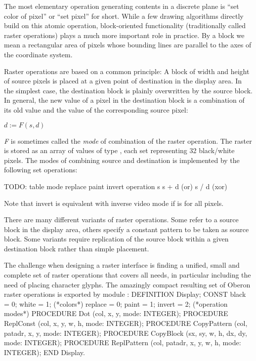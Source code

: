 The most elementary operation generating contents in a discrete plane
is ``set color of pixel'' or ``set pixel'' for short. While a few drawing
algorithms directly build on this atomic operation, block-oriented
functionality (traditionally called raster operations) plays a much
more important role in practice. By a block we mean a rectangular area
of pixels whose bounding lines are parallel to the axes of the
coordinate system.

Raster operations are based on a common principle: A block of width 
and height  of source pixels is placed at a given point of
destination  in the display area. In the simplest case, the
destination block  is plainly overwritten by the
source block. In general, the new value of a pixel in the destination
block is a combination of its old value and the value of the
corresponding source pixel:

$d := F(s, d)$

\emph{F} is sometimes called the \emph{mode} of combination of the
raster operation. The raster is stored as an array of values of type
, each set representing 32 black/white pixels. The modes of
combining source and destination is implemented by the following set
operations:

TODO: table
mode
replace paint invert
operation
s
s + d (or) s / d (xor)

Note that invert is equivalent with inverse video mode if  is 
for all pixels.

There are many different variants of raster operations. Some refer to
a source block in the display area, others specify a constant pattern
to be taken as source block. Some variants require replication of the
source block within a given destination block  rather
than simple placement.

The challenge when designing a raster interface is finding a unified,
small and complete set of raster operations that covers all needs, in
particular including the need of placing character glyphs. The
amazingly compact resulting set of Oberon raster operations is
exported by module :
\begintt
DEFINITION Display;
  CONST black = 0; white = 1; (*colors*)
        replace = 0; paint = 1; invert = 2; (*operation modes*)
  PROCEDURE Dot (col, x, y, mode: INTEGER);
  PROCEDURE ReplConst (col, x, y, w, h, mode: INTEGER);
  PROCEDURE CopyPattern (col, patadr, x, y, mode: INTEGER);
  PROCEDURE CopyBlock (sx, sy, w, h, dx, dy, mode: INTEGER);
  PROCEDURE ReplPattern (col, patadr, x, y, w, h, mode: INTEGER);
END Display.
\endtt

